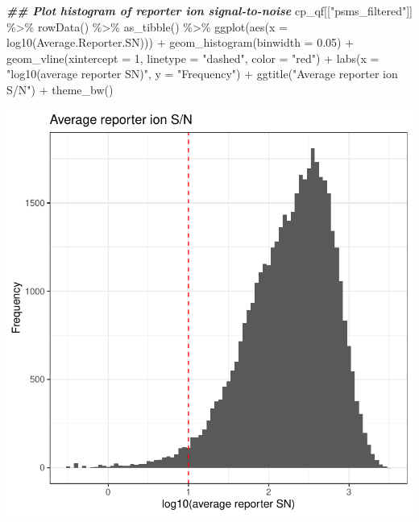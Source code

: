 \documentclass[9pt,a4paper,]{extarticle}
\newenvironment{Shaded}{\begin{snugshade}}{\end{snugshade}}
\newcommand{\AttributeTok}[1]{\textcolor[rgb]{0.77,0.63,0.00}{#1}}
\newcommand{\DecValTok}[1]{\textcolor[rgb]{0.00,0.00,0.81}{#1}}
\newcommand{\DocumentationTok}[1]{\textcolor[rgb]{0.56,0.35,0.01}{\textbf{\textit{#1}}}}
\newcommand{\FloatTok}[1]{\textcolor[rgb]{0.00,0.00,0.81}{#1}}
\newcommand{\FunctionTok}[1]{\textcolor[rgb]{0.00,0.00,0.00}{#1}}
\newcommand{\NormalTok}[1]{#1}
\newcommand{\SpecialCharTok}[1]{\textcolor[rgb]{0.00,0.00,0.00}{#1}}
\newcommand{\StringTok}[1]{\textcolor[rgb]{0.31,0.60,0.02}{#1}}
\begin{document}
\begin{Shaded}
\begin{Highlighting}[]
\DocumentationTok{\#\# Plot histogram of reporter ion signal{-}to{-}noise}
\NormalTok{cp\_qf[[}\StringTok{"psms\_filtered"}\NormalTok{]] }\SpecialCharTok{\%\textgreater{}\%} 
  \FunctionTok{rowData}\NormalTok{() }\SpecialCharTok{\%\textgreater{}\%} 
  \FunctionTok{as\_tibble}\NormalTok{() }\SpecialCharTok{\%\textgreater{}\%}
  \FunctionTok{ggplot}\NormalTok{(}\FunctionTok{aes}\NormalTok{(}\AttributeTok{x =} \FunctionTok{log10}\NormalTok{(Average.Reporter.SN))) }\SpecialCharTok{+}
  \FunctionTok{geom\_histogram}\NormalTok{(}\AttributeTok{binwidth =} \FloatTok{0.05}\NormalTok{) }\SpecialCharTok{+}
  \FunctionTok{geom\_vline}\NormalTok{(}\AttributeTok{xintercept =} \DecValTok{1}\NormalTok{, }\AttributeTok{linetype =} \StringTok{"dashed"}\NormalTok{, }\AttributeTok{color =} \StringTok{"red"}\NormalTok{) }\SpecialCharTok{+}
  \FunctionTok{labs}\NormalTok{(}\AttributeTok{x =} \StringTok{"log10(average reporter SN)"}\NormalTok{, }\AttributeTok{y =} \StringTok{"Frequency"}\NormalTok{) }\SpecialCharTok{+}
  \FunctionTok{ggtitle}\NormalTok{(}\StringTok{"Average reporter ion S/N"}\NormalTok{) }\SpecialCharTok{+}
  \FunctionTok{theme\_bw}\NormalTok{()}
\end{Highlighting}
\end{Shaded}

\begin{center}\includegraphics[height=0.3\textheight]{workflow_expressions_files/figure-latex/tmt_sn_ratio_2-1} \end{center}
\end{document}
